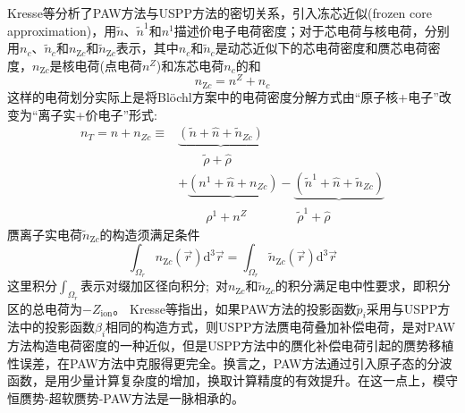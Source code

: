 \textrm{Kresse}等分析了\textrm{PAW}方法与\textrm{USPP}方法的密切关系，引入冻芯近似(\textrm{frozen core approximation})，用$\tilde n$、$\tilde n^1$和$n^1$描述价电子电荷密度；对于芯电荷与核电荷，分别用$n_c$、$\tilde n_c$和$n_{\mathrm{Z}c}$和$\tilde n_{\mathrm{Z}c}$表示，其中$n_c$和$\tilde n_c$是动芯近似下的芯电荷密度和赝芯电荷密度，$n_{\mathrm{Z}c}$是核电荷(点电荷$n^Z$)和冻芯电荷$n_c$的和
\begin{displaymath}
	n_{\mathrm{Z}c}=n^Z+n_c
\end{displaymath}
这样的电荷划分实际上是将\textrm{Bl\"ochl}方案中的电荷密度分解方式由``原子核+电子''改变为``离子实+价电子''形式:~
\begin{equation}
	\begin{aligned}
		n_T=n+n_{Zc}\equiv&\underbrace{(\tilde n+\hat n+\tilde n_{Zc})}\\
				 		&\qquad\tilde\rho+\hat\rho\\
				  &+\underbrace{(n^1+\hat n+n_{Zc})}-\underbrace{(\tilde n^1+\hat n+\tilde n_{Zc})}\\
				                  &\qquad~ \rho^1+n^Z\qquad\quad\quad\tilde\rho^1+\hat\rho
	\end{aligned}
	\label{eq:PAW_Kresse_02}
\end{equation}
赝离子实电荷$\tilde n_{\mathrm{Z}c}$的构造须满足条件
\begin{equation}
	\int_{\Omega_r}n_{\mathrm{Z}c}(\vec r)\mathrm{d}^3\vec r=\int_{\Omega_r}\tilde n_{\mathrm{Z}c}(\vec r)\mathrm{d}^3\vec r
	\label{eq:PAW_Kresse_01}
\end{equation}
这里积分$\int_{\Omega_r}$表示对缀加区径向积分;~对$n_{\mathrm{Z}c}$和$\tilde n_{\mathrm{Z}c}$的积分满足电中性要求，即积分区的总电荷为$-Z_{\mathrm{ion}}$。%
\textrm{Kresse}等指出，如果\textrm{PAW}方法的投影函数$\tilde p_i$采用与\textrm{USPP}方法中的投影函数$\beta_i$相同的构造方式，则\textrm{USPP}方法赝电荷叠加补偿电荷，是对\textrm{PAW}方法构造电荷密度的一种近似，但是\textrm{USPP}方法中的赝化补偿电荷引起的赝势移植性误差，在\textrm{PAW}方法中克服得更完全。换言之，\textrm{PAW}方法通过引入原子态的分波函数，是用少量计算复杂度的增加，换取计算精度的有效提升。在这一点上，模守恒赝势-超软赝势-PAW方法是一脉相承的。

